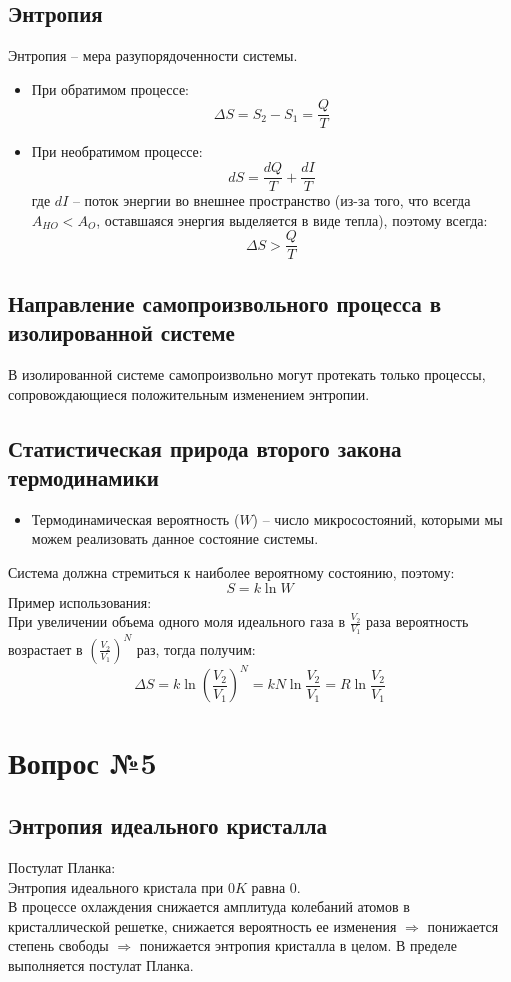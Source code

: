 \documentclass[14pt,a4paper]{scrartcl}
\begin{document}
	\subsection*{Энтропия} 
	Энтропия -- мера разупорядоченности системы.
	\begin{itemize}
		\item При обратимом процессе:
		$$\Delta{S} = S_2 - S_1 = \dfrac{Q}{T} $$ 
		\item При необратимом процессе:
		$$ dS = \dfrac{dQ}{T} + \dfrac{dI}{T} $$
		где $dI$ -- поток энергии во внешнее пространство (из-за того, что всегда $A_{HO} < A_O$, оставшаяся энергия выделяется в виде тепла), поэтому всегда:
		$$ \Delta{S} > \dfrac{Q}{T} $$
	\end{itemize}
	\subsection*{Направление самопроизвольного процесса в изолированной системе} 
	В изолированной системе самопроизвольно могут протекать только процессы, сопровождающиеся положительным изменением энтропии.
	\subsection*{Статистическая природа второго закона термодинамики} 
	\begin{itemize}
		\item Термодинамическая вероятность ($W$) -- число микросостояний, которыми мы можем реализовать данное состояние системы.
		
	\end{itemize}
	Система должна стремиться к наиболее вероятному состоянию, поэтому:
	$$ S = k \ln{W} $$
	Пример использования: \\
	При увеличении объема одного моля идеального газа в $\frac{V_2}{V_1}$ раза вероятность возрастает в $(\frac{V_2}{V_1})^N$ раз, тогда получим:
	$$ \Delta{S} = k \ln{(\frac{V_2}{V_1})^N} = k N \ln{\frac{V_2}{V_1}} = R \ln{\frac{V_2}{V_1}} $$ 

\section*{Вопрос №5}

	\subsection*{Энтропия идеального кристалла} 
	Постулат Планка: \\
	Энтропия идеального кристала при $0K$ равна $0$. \\
	В процессе охлаждения снижается амплитуда колебаний атомов в кристаллической решетке, снижается вероятность ее изменения $\Rightarrow$ понижается степень свободы $\Rightarrow$ понижается энтропия кристалла в целом. В пределе выполняется постулат Планка. 
\end{document}
